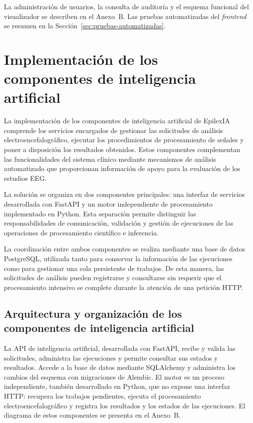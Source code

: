 \begin{nuevotexto}
La administración de usuarios, la consulta de auditoría y el esquema funcional del visualizador se describen en el Anexo~B.
Las pruebas automatizadas del \textit{frontend} se resumen en la Sección~\ref{sec:pruebas-automatizadas}.
\end{nuevotexto}

\section{Implementación de los componentes de inteligencia artificial}

La implementación de los componentes de inteligencia artificial
de EpilexIA comprende los servicios encargados de gestionar
las solicitudes de análisis electroencefalográfico, ejecutar
los procedimientos de procesamiento de señales y poner a
disposición los resultados obtenidos. Estos componentes
complementan las funcionalidades del sistema clínico mediante
mecanismos de análisis automatizado que proporcionan
información de apoyo para la evaluación de los estudios EEG.

La solución se organiza en dos componentes principales:
una interfaz de servicios desarrollada con FastAPI y un
motor independiente de procesamiento implementado en Python.
Esta separación permite distinguir las responsabilidades
de comunicación, validación y gestión de ejecuciones de
las operaciones de procesamiento científico e inferencia.

La coordinación entre ambos componentes se realiza mediante
una base de datos PostgreSQL, utilizada tanto para conservar
la información de las ejecuciones como para gestionar una
cola persistente de trabajos. De esta manera, las solicitudes
de análisis pueden registrarse y consultarse sin requerir
que el procesamiento intensivo se complete durante la
atención de una petición HTTP.

\subsection{Arquitectura y organización de los componentes de inteligencia artificial}

\begin{nuevotextodos}
La API de inteligencia artificial, desarrollada con FastAPI, recibe y valida las solicitudes, administra las ejecuciones y permite consultar sus estados y resultados.
Accede a la base de datos mediante SQLAlchemy y administra los cambios del esquema con migraciones de Alembic.
El motor es un proceso independiente, también desarrollado en Python, que no expone una interfaz HTTP: recupera los trabajos pendientes, ejecuta el procesamiento electroencefalográfico y registra los resultados y los estados de las ejecuciones.
El diagrama de estos componentes se presenta en el Anexo~B.
\end{nuevotextodos}

